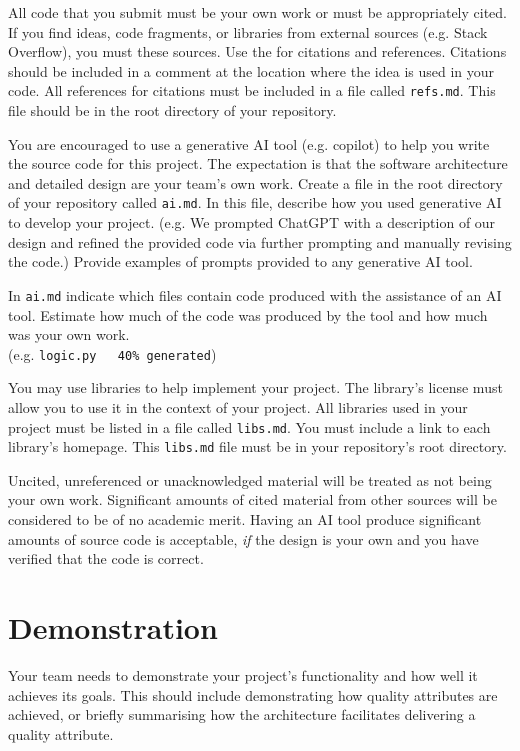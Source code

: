 \documentclass{csse4400}
\begin{document}
All code that you submit must be your own work or must be appropriately cited.
If you find ideas, code fragments, or libraries from external sources (e.g. Stack Overflow), you must  these sources.
Use the  for citations and references.
Citations should be included in a comment at the location where the idea is used in your code.
All references for citations must be included in a file called \texttt{refs.md}.
This file should be in the root directory of your repository.

You are encouraged to use a generative AI tool (e.g. copilot) to help you write the source code for this project.
The expectation is that the software architecture and detailed design are your team's own work.
Create a file in the root directory of your repository called \texttt{ai.md}.
In this file, describe how you used generative AI to develop your project.
(e.g. We prompted ChatGPT with a description of our design
and refined the provided code via further prompting and manually revising the code.)
Provide examples of prompts provided to any generative AI tool.

In \texttt{ai.md} indicate which files contain code produced with the assistance of an AI tool.
Estimate how much of the code was produced by the tool and how much was your own work.\\
(e.g. \texttt{logic.py ~~40\% generated})

You may use libraries to help implement your project.
The library's license must allow you to use it in the context of your project.
All libraries used in your project must be listed in a file called \texttt{libs.md}.
You must include a link to each library's homepage.
This \texttt{libs.md} file must be in your repository's root directory.

Uncited, unreferenced or unacknowledged material will be treated as not being your own work.
Significant amounts of cited material from other sources will be considered to be of no academic merit.
Having an AI tool produce significant amounts of source code is acceptable,
\textit{if} the design is your own and you have verified that the code is correct.


\section{Demonstration}
Your team needs to demonstrate your project's functionality and how well it achieves its goals.
This should include demonstrating how quality attributes are achieved,
or briefly summarising how the architecture facilitates delivering a quality attribute.
\end{document}
